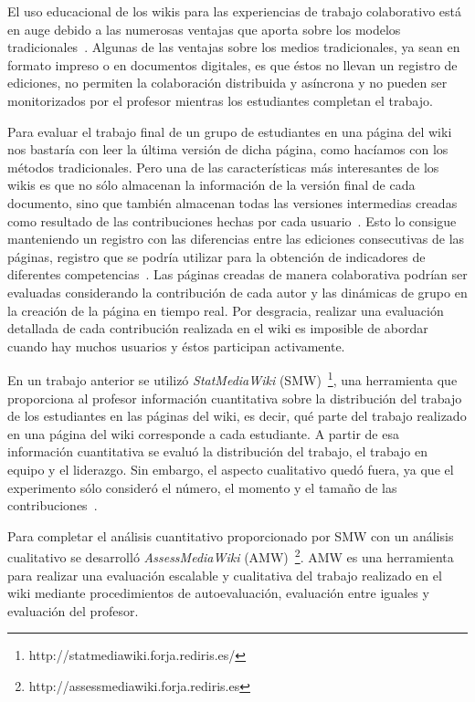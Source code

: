 El uso educacional de los wikis para las experiencias de trabajo colaborativo está en auge debido a las numerosas ventajas que aporta sobre los modelos tradicionales~\cite{elgort2008wiki}. Algunas de las ventajas sobre los medios tradicionales, ya sean en formato impreso o en documentos digitales, es que éstos no llevan un registro de ediciones, no permiten la colaboración distribuida y asíncrona y no pueden ser monitorizados por el profesor mientras los estudiantes completan el trabajo.

Para evaluar el trabajo final de un grupo de estudiantes en una página del wiki nos bastaría con leer la última versión de dicha página, como hacíamos con los métodos tradicionales. Pero una de las características más interesantes de los wikis es que no sólo almacenan la información de la versión final de cada documento, sino que también almacenan todas las versiones intermedias creadas como resultado de las contribuciones hechas por cada usuario~\cite{trentin2009using}. Esto lo consigue manteniendo un registro con las diferencias entre las ediciones consecutivas de las páginas, registro que se podría utilizar para la obtención de indicadores de diferentes competencias~\cite{ortega2011new}. Las páginas creadas de manera colaborativa podrían ser evaluadas considerando la contribución de cada autor y las dinámicas de grupo en la creación de la página en tiempo real. Por desgracia, realizar una evaluación detallada de cada contribución realizada en el wiki es imposible de abordar cuando hay muchos usuarios y éstos participan activamente.

En un trabajo anterior se utilizó \emph{StatMediaWiki} (SMW)~\footnote{http://statmediawiki.forja.rediris.es/}, una herramienta que proporciona al profesor información cuantitativa sobre la distribución del trabajo de los estudiantes en las páginas del wiki, es decir, qué parte del trabajo realizado en una página del wiki corresponde a cada estudiante. A partir de esa información cuantitativa se evaluó la distribución del trabajo, el trabajo en equipo y el liderazgo. Sin embargo, el aspecto cualitativo quedó fuera, ya que el experimento sólo consideró el número, el momento y el tamaño de las contribuciones~\cite{palomo2014assessment}.

Para completar el análisis cuantitativo proporcionado por SMW con un análisis cualitativo se desarrolló \emph{AssessMediaWiki} (AMW)~\footnote{http://assessmediawiki.forja.rediris.es}. AMW es una herramienta para realizar una evaluación escalable y cualitativa del trabajo realizado en el wiki mediante procedimientos de autoevaluación, evaluación entre iguales y evaluación del profesor.

